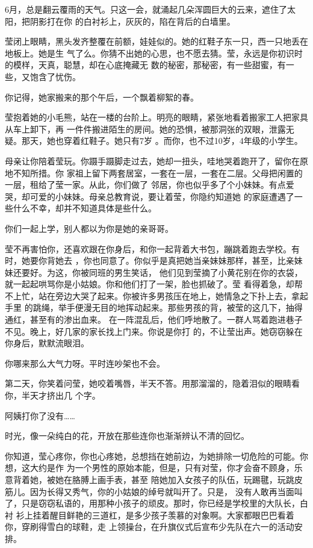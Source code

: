 \documentclass[12pt,a4paper]{article}
\begin{document}
		6月，总是翻云覆雨的天气。只这一会，就涌起几朵浑圆巨大的云来，遮住了太阳，把阴影打在你
	的白衬衫上，灰灰的，陷在背后的白墙里。

		莹闭上眼睛，黑头发齐整覆在前额，娃娃似的。她的红鞋子东一只，西一只地丢在地板上。她是生
	气了么。你猜不出她的心思，也不愿去猜。莹，永远是你初识时的模样，天真，聪慧，却在心底掩藏无
	数的秘密，那秘密，有一些甜蜜，有一些，又饱含了忧伤。


		你记得，她家搬来的那个午后，一个飘着柳絮的春。


		莹抱着她的小毛熊，站在一楼的台阶上。明亮的眼睛，紧张地看着搬家工人把家具从车上卸下，再
	一件件搬进陌生的房间。她的恐惧，被那洞张的双眼，泄露无疑。那天，她也穿着红鞋子。她只有7岁
	。而你，也不过10岁，4年级的小学生。

		母亲让你陪着莹玩。你蹑手蹑脚走过去，她却一扭头，哇地哭着跑开了，留你在原地不知所措。你
	家祖上留下两套居室，一套在一层，一套在二层。父母把闲置的一层，租给了莹一家。从此，你们做了
	邻居，你也似乎多了个小妹妹。有点爱哭，却可爱的小妹妹。母亲总教育说，要让着莹，你隐约知道她
	的家庭遭遇了一些什么不幸，却并不知道具体是些什么。


		你们一起上学，别人都以为你是她的亲哥哥。

		莹不再害怕你，还喜欢跟在你身后，和你一起背着大书包，蹦跳着跑去学校。有时，她要你背她去
	，你也同意了。你似乎是真把她当亲妹妹那样，甚至，比亲妹妹还要好。为这，你被同班的男生笑话，
	他们见到莹摘了小黄花别在你的衣袋，就一起起哄骂你是小姑娘。你和他们打了一架，脸也抓破了。莹
	看得着急，却帮不上忙，站在旁边大哭了起来。你被许多男孩压在地上，她情急之下扑上去，拿起手里
	的跳绳，举手便漫无目的地挥动起来。那些男孩的背，被莹的这几下，抽得通红，甚至有的渗出血来。
	在一阵混乱后，他们呼地散了。一群人骂着跑进巷子不见。晚上，好几家的家长找上门来。你说是你打
	的，不让莹出声。她窃窃躲在你身后，默默流眼泪。


		你哪来那么大气力呀。平时连吵架也不会。

		第二天，你笑着问莹，她咬着嘴唇，半天不答。用那溜溜的，隐着泪似的眼睛看你，半天才挤出几
	个字。

		阿姨打你了没有……


		时光，像一朵纯白的花，开放在那些连你也渐渐辨认不清的回忆。

		你知道，莹心疼你，你也心疼她，总想挡在她前边，为她排除一切危险的可能。你想，这大约是作
	为一个男性的原始本能，但是，只有对莹，你才会奋不顾身，乐意背着她，被她在胳膊上画手表，甚至
	陪她加入女孩子的队伍，玩踢毽，玩跳皮筋儿。因为长得又秀气，你的小姑娘的绰号就叫开了。只是，
	没有人敢再当面叫了，只是窃窃私语的，用那种小孩子的顽皮。那时，你已经是学校里的大队长，白衬
	衫上挂着醒目鲜艳的三道杠，是多少孩子羡慕的对象啊。大家都眼巴巴看着你，穿刷得雪白的球鞋，走
	上领操台，在升旗仪式后宣布少先队在六一的活动安排。
\end{document}
